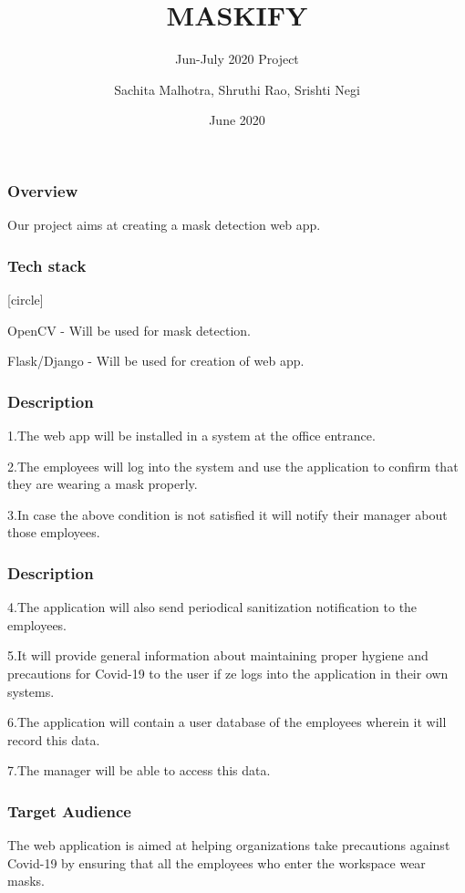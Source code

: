 \documentclass[14pt]{beamer}
\title{MASKIFY}
\subtitle{Jun-July 2020 Project}
\author[TEAM 6]{Sachita Malhotra, Shruthi Rao, Srishti Negi}
\date{June 2020}
\begin{document}
\begin{frame}
    \titlepage
\end{frame}

\begin{frame}
    \frametitle{Overview}
    Our project aims at creating a mask detection web app.
\end{frame}

\begin{frame}
    \frametitle{Tech stack}
    [circle]
        \begin{itemsize}
        \item OpenCV - Will be used for mask detection.
        \item Flask/Django - Will be used for creation of web app.
        \end{itemsize}
\end{frame} 

\begin{frame}
    \frametitle{Description}
    1.The web app will be installed in a system at the office entrance.

    2.The employees will log into the system and use the application to confirm that they are wearing a mask properly.

    3.In case the above condition is not satisfied it will notify their manager about those employees.
\end{frame}

\begin{frame}
    \frametitle{Description}
    4.The application will also send periodical sanitization notification to the employees.
    
    5.It will provide general information about maintaining proper hygiene and precautions for Covid-19 to the user if ze logs into the application in their own systems.
    
    6.The application will contain a user database of the employees wherein it will record this data.
    
    7.The manager will be able to access this data.
\end{frame}

\begin{frame}
    \frametitle{Target Audience}
    The web application is  aimed at helping organizations take precautions against Covid-19 by ensuring that all the employees who enter the workspace wear masks.
\end{frame}
\end{document}
